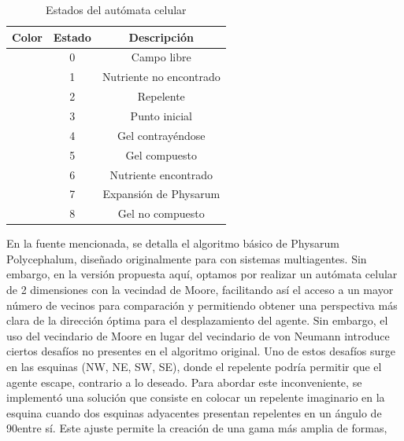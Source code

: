     \begin{table}[h]
        \begin{center}
            \begin{tabular}{|c|c|c|}
                \hline
                \textbf{Color}&\textbf{Estado}&\textbf{Descripci\'on} \\
                \hline
                \cellcolor{blue} & 0 & Campo libre  \\
                \cellcolor{royalblue} & 1 & Nutriente no encontrado \\
                \cellcolor{red} & 2 & Repelente \\
                \cellcolor{black} & 3 & Punto inicial \\
                \cellcolor{yellow} & 4 & Gel contray\'endose \\
                \cellcolor{darkgreen} & 5 & Gel compuesto \\
                \cellcolor{lemon} & 6 & Nutriente encontrado \\
                \cellcolor{darkgray} & 7 & Expansi\'on de Physarum \\
                \cellcolor{green} & 8 & Gel no compuesto \\
                \hline
            \end{tabular}
        \end{center}
        \caption{Estados del aut\'omata celular}
        \label{tab:estados}
    \end{table}
    \vskip 0.5cm
    En la fuente mencionada, se detalla el algoritmo b\'asico de Physarum Polycephalum, dise\~nado originalmente para con
        sistemas multiagentes. Sin embargo, en la versi\'on propuesta aqu\'i, optamos por realizar un aut\'omata celular de 2 dimensiones con la vecindad de Moore, 
        facilitando as\'i el acceso a un mayor n\'umero de vecinos para comparaci\'on y permitiendo obtener una perspectiva m\'as clara de la direcci\'on \'optima 
        para el desplazamiento del agente.
    \vskip 0.5cm
    Sin embargo, el uso del vecindario de Moore en lugar del vecindario de von Neumann introduce ciertos desaf\'ios no presentes en el algoritmo original. 
        Uno de estos desaf\'ios surge en las esquinas (NW, NE, SW, SE), donde el repelente podr\'ia permitir que el agente escape, 
        contrario a lo deseado. Para abordar este inconveniente, se implement\'o una soluci\'on que consiste en colocar un repelente imaginario en la esquina cuando 
        dos esquinas adyacentes presentan repelentes en un \'angulo de 90\degree  entre s\'i. Este ajuste permite la creaci\'on de una gama m\'as amplia de formas, 

